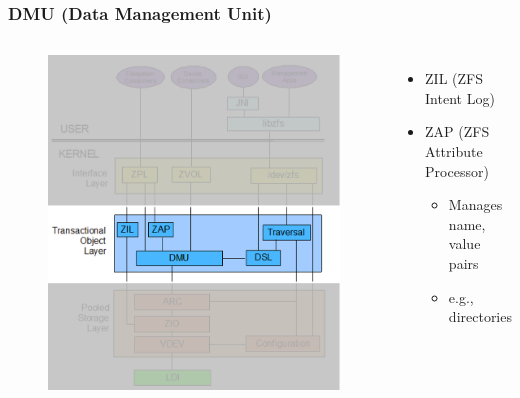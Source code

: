 % 
% 
\begin{frame}[fragile]
    \frametitle{DMU (Data Management Unit)}

\begin{columns}[c] %


    \begin{figure}
    \includegraphics[width=0.85\linewidth]{figs/ZFS-dmu.png}
    \end{figure}


    \begin{itemize}
        \item ZIL (ZFS Intent Log)

        \item ZAP (ZFS Attribute Processor)
      \begin{itemize}
          \item Manages {name, value} pairs
          \item e.g., directories
      \end{itemize}


\end{itemize}
\end{columns}
\end{frame}
